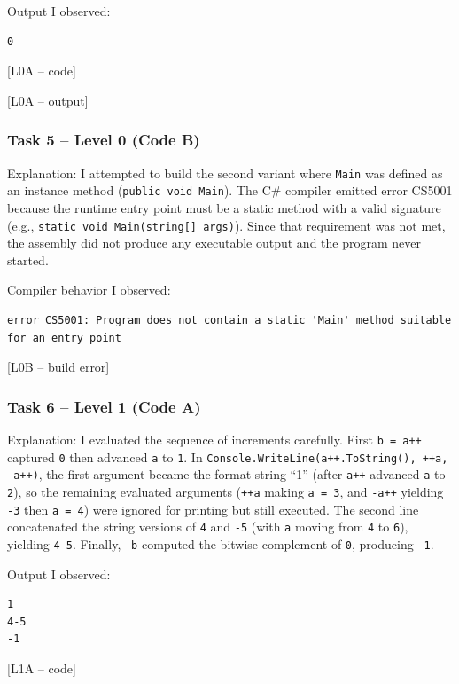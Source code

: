 Output I observed:
\begin{verbatim}
0
\end{verbatim}

[L0A -- code]

[L0A -- output]

\subsubsection{Task 5 -- Level 0 (Code B)}
Explanation: I attempted to build the second variant where \texttt{Main} was defined as an instance method (\texttt{public void Main}). The C\# compiler emitted error CS5001 because the runtime entry point must be a static method with a valid signature (e.g., \texttt{static void Main(string[] args)}). Since that requirement was not met, the assembly did not produce any executable output and the program never started.

Compiler behavior I observed:
\begin{verbatim}
error CS5001: Program does not contain a static 'Main' method suitable for an entry point
\end{verbatim}

[L0B -- build error]

\subsubsection{Task 6 -- Level 1 (Code A)}
Explanation: I evaluated the sequence of increments carefully. First \texttt{b = a++} captured \texttt{0} then advanced \texttt{a} to \texttt{1}. In \texttt{Console.WriteLine(a++.ToString(), ++a, -a++)}, the first argument became the format string ``1'' (after \texttt{a++} advanced \texttt{a} to \texttt{2}), so the remaining evaluated arguments (\texttt{++a} making \texttt{a = 3}, and \texttt{-a++} yielding \texttt{-3} then \texttt{a = 4}) were ignored for printing but still executed. The second line concatenated the string versions of \texttt{4} and \texttt{-5} (with \texttt{a} moving from \texttt{4} to \texttt{6}), yielding \texttt{4-5}. Finally, \texttt{~b} computed the bitwise complement of \texttt{0}, producing \texttt{-1}.

Output I observed:
\begin{verbatim}
1
4-5
-1
\end{verbatim}

[L1A -- code]

